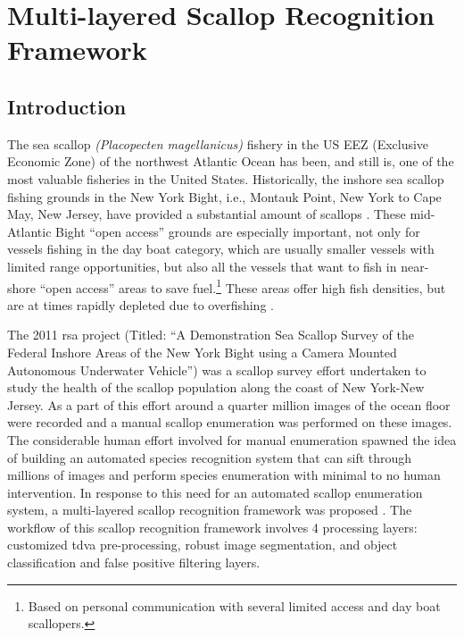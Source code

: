 
\chapter{Multi-layered Scallop Recognition Framework}
\label{chap:scallop_recog}


\section{Introduction}

The sea scallop \textit{(Placopecten magellanicus)} fishery in the 
US EEZ (Exclusive Economic Zone) of the northwest Atlantic Ocean has been, and still is, one of 
the most valuable fisheries in the United States. 
Historically, the inshore sea scallop fishing grounds in the New York Bight, 
i.e., Montauk Point, New York to Cape May, New Jersey, have provided 
a substantial amount of scallops \cite{caddy, serchuk, hart, naidu, fisheries}.
These mid-Atlantic Bight ``open access'' 
grounds are especially important, not only for vessels fishing in the day boat 
category, which are usually smaller vessels with limited range opportunities, 
but also all the vessels that want to fish in near-shore ``open access'' 
areas to save fuel.\footnote{Based on personal communication with several limited 
access and day boat scallopers.} 
These areas offer high fish densities, but are at times rapidly depleted due 
to overfishing \cite{rosenberg}.      

The 2011 \gls{rsa} 
project (Titled: ``A Demonstration Sea Scallop Survey of the 
Federal Inshore Areas of the New York Bight using a Camera Mounted Autonomous Underwater
Vehicle'') was a scallop survey effort undertaken to study the health of the scallop population
along the coast of New York-New Jersey. As a part of this effort around a quarter million images of the 
ocean floor were recorded and a manual scallop enumeration was performed on these images.
The considerable human effort involved for manual enumeration spawned the idea of building an automated species
recognition system that can sift through millions of images and perform species enumeration with minimal to no human intervention.
In response to this need for an automated scallop enumeration system, a multi-layered scallop
recognition framework was proposed \cite{prasanna_med, prasanna_aslo, prasanna_igi}.
The workflow of this scallop recognition framework involves 4 processing layers:
customized \gls{tdva} pre-processing, robust image 
segmentation, and object classification and false positive filtering layers. 

